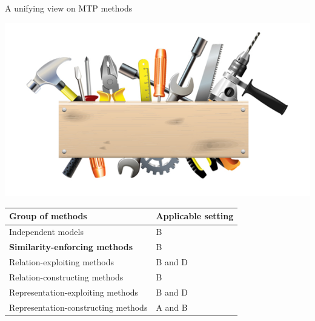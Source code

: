 \documentclass[]{beamer}
\renewcommand{\alert}[1]{\textbf{\color{putblue} #1}}
\begin{document}
\begin{frame}{A unifying view on MTP methods}

\begin{center}
\includegraphics[scale=0.3]{pics/tools}

\begin{tabular}{ll}
\hline
Group of methods & Applicable setting \\
\hline
\hline
Independent models & B \\
\alert{Similarity-enforcing methods} & B   \\ 
Relation-exploiting methods & B and D  \\
Relation-constructing methods & B \\
Representation-exploiting methods & B and D \\
Representation-constructing methods & A and B \\
\hline  
\end{tabular}
\end{center}
\end{frame}
\end{document}
